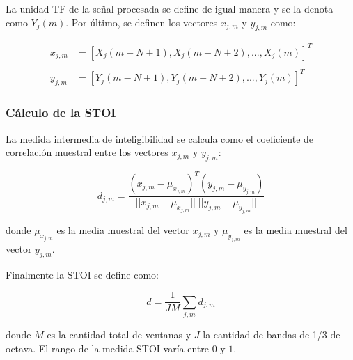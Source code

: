 La unidad TF de la señal procesada se define de igual manera y se la denota como $Y_j(m)$. Por último, se definen los vectores $x_{j,m}$ y $y_{j,m}$ como:

\begin{align*}
	x_{j,m} &= [X_j(m - N + 1), X_j(m - N + 2), ..., X_j(m)]^T \\ \\
	y_{j,m} &= [Y_j(m - N + 1), Y_j(m - N + 2), ..., Y_j(m)]^T
\end{align*}

\subsubsection{Cálculo de la STOI}

La medida intermedia de inteligibilidad se calcula como el coeficiente de correlación muestral entre los vectores $x_{j,m}$ y $y_{j,m}$:

\begin{equation*}
	d_{j,m} = \frac{(x_{j,m} - \mu_{x_{j,m}})^T (y_{j,m} - \mu_{y_{j,m}})}{|| x_{j,m} - \mu_{x_{j,m}} || \; ||y_{j,m} - \mu_{y_{j,m}}||}
\end{equation*}

donde $\mu_{x_{j,m}}$ es la media muestral del vector $x_{j,m}$ y $\mu_{y_{j,m}}$ es la media muestral del vector $y_{j,m}$.

Finalmente la STOI se define como:

\begin{equation*}
	d = \frac{1}{JM} \sum_{j,m} d_{j,m}
\end{equation*}

donde $M$ es la cantidad total de ventanas y $J$ la cantidad de bandas de 1/3 de octava. El rango de la medida STOI varía entre $0$ y $1$.